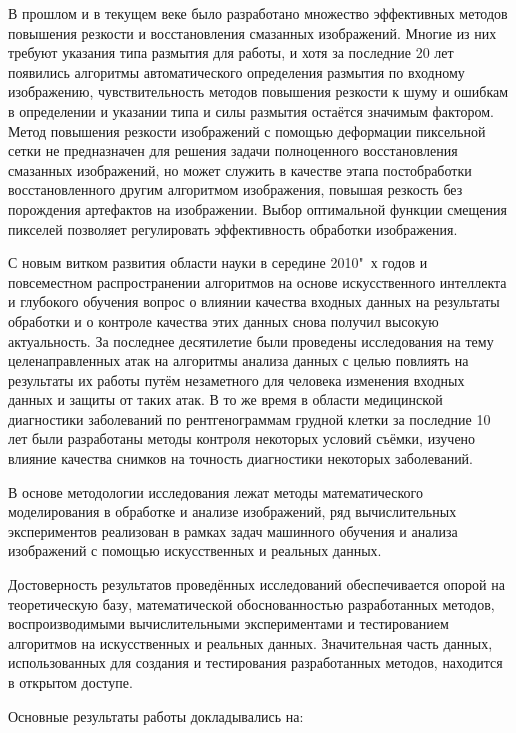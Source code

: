 В прошлом и в текущем веке было разработано множество эффективных методов повышения резкости и восстановления смазанных изображений. Многие из них требуют указания типа размытия для работы, и хотя за последние 20 лет появились алгоритмы автоматического определения размытия по входному изображению, чувствительность методов повышения резкости к шуму и ошибкам в определении и указании типа и силы размытия остаётся значимым фактором. Метод повышения резкости изображений с помощью деформации пиксельной сетки не предназначен для решения задачи полноценного восстановления смазанных изображений, но может служить в качестве этапа постобработки восстановленного другим алгоритмом изображения, повышая резкость без порождения артефактов на изображении. Выбор оптимальной функции смещения пикселей позволяет регулировать эффективность обработки изображения.

С новым витком развития области науки в середине 2010"~х годов и повсеместном распространении алгоритмов на основе искусственного интеллекта и глубокого обучения вопрос о влиянии качества входных данных на результаты обработки и о контроле качества этих данных снова получил высокую актуальность. За последнее десятилетие были проведены исследования на тему целенаправленных атак на алгоритмы анализа данных с целью повлиять на результаты их работы путём незаметного для человека изменения входных данных и защиты от таких атак. В то же время в области медицинской диагностики заболеваний по рентгенограммам грудной клетки за последние 10 лет были разработаны методы контроля некоторых условий съёмки, изучено влияние качества снимков на точность диагностики некоторых заболеваний.


{\methods} 

В основе методологии исследования лежат методы математического моделирования в обработке и анализе изображений, ряд вычислительных экспериментов реализован в рамках задач машинного обучения и анализа изображений с помощью искусственных и реальных данных.


{\reliability}

Достоверность результатов проведённых исследований обеспечивается опорой на теоретическую базу, математической обоснованностью разработанных методов, воспроизводимыми вычислительными экспериментами и тестированием алгоритмов на искусственных и реальных данных. Значительная часть данных, использованных для создания и тестирования разработанных методов, находится в открытом доступе.


{\probation}
Основные результаты работы докладывались на:

